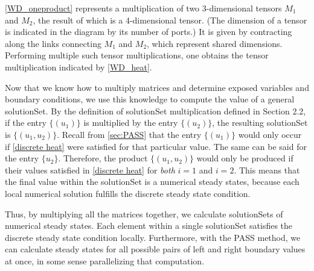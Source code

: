 \documentclass[11pt]{article}
\begin{document}
\cref{WD_oneproduct} represents a multiplication of two 3-dimensional tensors $M_1$ and $M_2$, the result of which is a 4-dimensional tensor. (The dimension of a tensor is indicated in the diagram by its number of ports.) It is given by contracting along the links connecting $M_1$ and $M_2$, which represent shared dimensions. Performing multiple such tensor multiplications, one obtains the tensor multiplication indicated by \cref{WD_heat}.


\begin{figure*}
\caption{Wiring diagram for a single product with 3 exposed variables and 4 total variables}
\label{WD_oneproduct}
\begin{center}
\end{center}
\end{figure*}

Now that we know how to multiply matrices and determine exposed variables and boundary conditions, we use this knowledge to compute the value of a general solutionSet.  By the definition of solutionSet multiplication defined in Section 2.2, if the entry $\{(u_1)\}$ is multiplied by the entry $\{(u_2)\}$, the resulting solutionSet is $\{(u_1, u_2)\}$. Recall from \cref{sec:PASS} that the entry $\{(u_1)\}$ would only occur if \cref{discrete heat} were satisfied for that particular value. The same can be said for the entry $\{u_2\}$. Therefore, the product $\{(u_1, u_2)\}$ would only be produced if their values satisfied in \cref{discrete heat} for \textit{both} $i = 1$ and $i = 2$. This means that the final value within the solutionSet is a numerical steady states, because each local numerical solution fulfills the discrete steady state condition.

Thus, by multiplying all the matrices together, we calculate solutionSets of numerical steady states. Each element within a single solutionSet satisfies the discrete steady state condition locally. Furthermore, with the PASS method, we can calculate steady states for all possible pairs of left and right boundary values at once, in some sense parallelizing that computation.
\end{document}
